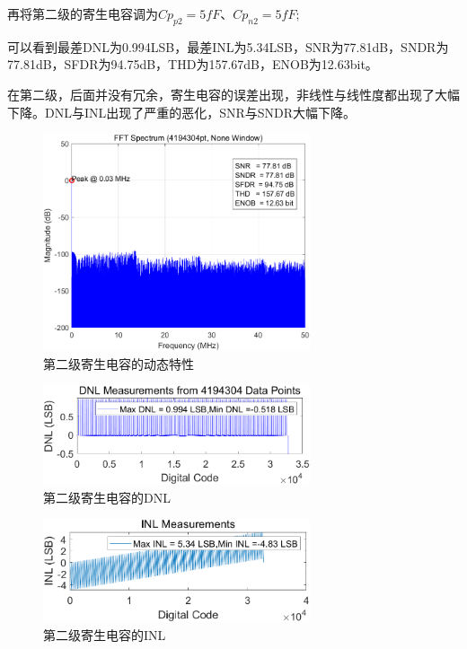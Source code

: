 \documentclass[cs4size,a4paper]{ctexart}
\numberwithin{equation}{section}
\numberwithin{table}{section}
\numberwithin{figure}{section}
\begin{document}
\begin{itemize}
		再将第二级的寄生电容调为$Cp_{p2}  = 5fF $、$ Cp_{n2} = 5fF;$
		
		可以看到最差DNL为0.994LSB，最差INL为5.34LSB，SNR为77.81dB，SNDR为77.81dB，SFDR为94.75dB，THD为157.67dB，ENOB为12.63bit。
		
		在第二级，后面并没有冗余，寄生电容的误差出现，非线性与线性度都出现了大幅下降。DNL与INL出现了严重的恶化，SNR与SNDR大幅下降。
		\begin{figure}[H]
			\centering
			\includegraphics[width=0.7\textwidth]{pic/Co/DFT2.png}
			\caption{第二级寄生电容的动态特性}
		\end{figure}

		\begin{figure}[H]
			\centering
			\includegraphics[width=0.7\textwidth]{pic/Co/DNL2.png}
			\caption{第二级寄生电容的DNL}
		\end{figure}

		\begin{figure}[H]
			\centering
			\includegraphics[width=0.7\textwidth]{pic/Co/INL2.png}
			\caption{第二级寄生电容的INL}
		\end{figure}
	\end{itemize}
\end{document}
